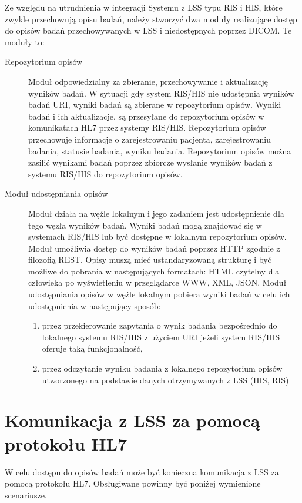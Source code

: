 \documentclass[a4paper]{report}
\begin{document}
Ze względu na utrudnienia w integracji Systemu z LSS typu RIS i HIS, które zwykle przechowują opisu badań, należy stworzyć dwa moduły realizujące dostęp do opisów badań przechowywanych w LSS i niedostępnych poprzez DICOM. Te moduły to:
\begin{description}
  \item[Repozytorium opisów] Moduł odpowiedzialny za zbieranie, przechowywanie i aktualizację wyników badań. W sytuacji gdy system RIS/HIS nie udostępnia wyników badań URI, wyniki badań są zbierane w repozytorium opisów. Wyniki badań i ich aktualizacje, są przesyłane do repozytorium opisów w komunikatach HL7 przez systemy RIS/HIS. Repozytorium opisów przechowuje informacje o zarejestrowaniu pacjenta, zarejestrowaniu badania, statusie badania, wyniku badania. Repozytorium opisów można zasilić wynikami badań poprzez zbiorcze wysłanie wyników badań z systemu RIS/HIS do repozytorium opisów.
  \item[Moduł udostępniania opisów] Moduł działa na węźle lokalnym i jego zadaniem jest udostępnienie dla tego węzła wyników badań. Wyniki badań mogą znajdować się w systemach RIS/HIS lub być dostępne w lokalnym repozytorium opisów. Moduł umożliwia dostęp do wyników badań poprzez HTTP zgodnie z filozofią REST. Opisy muszą mieć ustandaryzowaną strukturę i być możliwe do pobrania w następujących formatach: HTML czytelny dla człowieka po wyświetleniu w przeglądarce WWW, XML, JSON. Moduł udostępniania opisów w węźle lokalnym pobiera wyniki badań w celu ich udostępnienia w następujący sposób:
  \begin{enumerate}
    \item przez przekierowanie zapytania o wynik badania bezpośrednio do lokalnego systemu RIS/HIS z użyciem URI  jeżeli system RIS/HIS oferuje taką funkcjonalność,
    \item przez odczytanie wyniku badania z lokalnego repozytorium opisów utworzonego na podstawie danych otrzymywanych z LSS (HIS, RIS)
  \end{enumerate}

\end{description}

\section{Komunikacja z LSS za pomocą protokołu HL7}

W celu dostępu do opisów badań może być konieczna komunikacja z LSS za pomocą protokołu HL7. Obsługiwane powinny być poniżej wymienione scenariusze.
\end{document}
